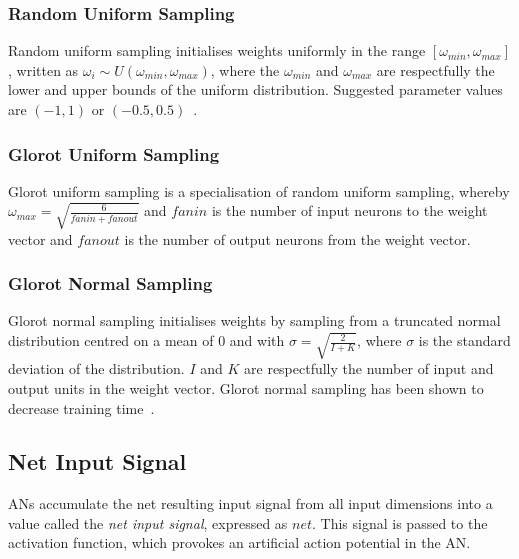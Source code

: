 \subsubsection{Random Uniform Sampling}\label{sec:anns:an:weights:random_uniform_sampling}

Random uniform sampling initialises weights uniformly in the range $[\omega_{min}, \omega_{max}]$, written as $\omega_{i} \sim \textit{U} (\omega_{min}, \omega_{max})$, where the $\omega_{min}$ and $\omega_{max}$ are respectfully the lower and upper bounds of the uniform distribution. Suggested parameter values are $(-1, 1)$ or $(-0.5, 0.5)$~\cite{ref:nguyen:1990}.


\subsubsection{Glorot Uniform Sampling}\label{sec:anns:an:weights:glorot_uniform_sampling}

Glorot uniform sampling is a specialisation of random uniform sampling, whereby $\omega_{max} = \sqrt{\frac{6}{fanin + fanout}}$ and $fanin$ is the number of input neurons to the weight vector and $fanout$ is the number of output neurons from the weight vector.

\subsubsection{Glorot Normal Sampling}\label{sec:anns:an:weights:glorot_normal_sampling}

Glorot normal sampling initialises weights by sampling from a truncated normal distribution centred on a mean of $0$ and with $\sigma = \sqrt{\frac{2}{I + K}}$, where $\sigma$ is the standard deviation of the distribution. $I$ and $K$ are respectfully the number of input and output units in the weight vector. Glorot normal sampling has been shown to decrease training time~\cite{ref:glorot:2010}.


\subsection{Net Input Signal}\label{sec:anns:an:net_input}

\acp{AN} accumulate the net resulting input signal from all input dimensions into a value called the \textit{net input signal}, expressed as $net$. This signal is passed to the activation function, which provokes an artificial action potential in the \acs{AN}.

